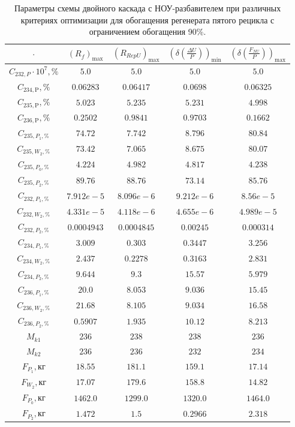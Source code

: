 \begin{table}
    \begin{tabular}{ccccc}
    $\cdot$ & $(R_f)_\text{max}$ & $(R_{RepU})_\text{max}$ & $(\delta(\frac{\Delta U}{P}))_\text{min}$ & $(\delta(\frac{F_{NU}}{P}))_\text{max}$\\ \hline
    $C_{232,P}\cdot10^{7}, \%$ & $5.0$ & $5.0$ & $5.0$ & $5.0$\\ \hline
    $C_{234,\text{P}}, \%$ & $0.06283$ & $0.06417$ & $0.0698$ & $0.06325$\\ \hline
    $C_{235,\text{P}}, \%$ & $5.023$ & $5.235$ & $5.231$ & $4.998$\\ \hline
    $C_{236,\text{P}}, \%$ & $0.2502$ & $0.9841$ & $0.9703$ & $0.1662$\\ \hline
    $C_{235,P_1, \%}$      & $74.72$ & $7.742$ & $8.796$ & $80.84$\\ \hline
    $C_{235,W_2, \%}$      & $73.42$ & $7.065$ & $8.675$ & $80.07$\\ \hline
    $C_{235,P_0, \%}$      & $4.224$ & $4.982$ & $4.817$ & $4.238$\\ \hline
    $C_{235,P_2, \%}$      & $89.76$ & $88.76$ & $73.14$ & $85.76$\\ \hline
    $C_{232,P_1, \%}$      & $7.912e-5$ & $8.096e-6$ & $9.212e-6$ & $8.56e-5$\\ \hline
    $C_{232,W_2, \%}$      & $4.331e-5$ & $4.118e-6$ & $4.655e-6$ & $4.989e-5$\\ \hline
    $C_{232,P_2, \%}$      & $0.0004943$ & $0.0004845$ & $0.00245$ & $0.000314$\\ \hline
    $C_{234,P_1, \%}$      & $3.009$ & $0.303$ & $0.3447$ & $3.256$\\ \hline
    $C_{234,W_2, \%}$      & $2.437$ & $0.2278$ & $0.3163$ & $2.831$\\ \hline
    $C_{234,P_2, \%}$      & $9.644$ & $9.3$ & $15.57$ & $5.979$\\ \hline
    $C_{236,P_1, \%}$      & $20.0$ & $8.053$ & $9.036$ & $15.45$\\ \hline
    $C_{236,W_2, \%}$      & $21.68$ & $8.105$ & $9.034$ & $16.58$\\ \hline
    $C_{236,P_2, \%}$      & $0.5907$ & $1.935$ & $10.12$ & $8.213$\\ \hline
    $M_{k1}$               & $236$ & $238$ & $238$ & $236$\\ \hline
    $M_{k2}$               & $236$ & $236$ & $232$ & $234$\\ \hline
    $F_{P_1}, \text{кг}$   & $18.55$ & $181.1$ & $159.1$ & $17.14$\\ \hline
    $F_{W_2}, \text{кг}$   & $17.07$ & $179.6$ & $158.8$ & $14.82$\\ \hline
    $F_{P_0}, \text{кг}$   & $1462.0$ & $1299.0$ & $1320.0$ & $1464.0$\\ \hline
    $F_{P_2}, \text{кг}$   & $1.472$ & $1.5$ & $0.2966$ & $2.318$
    \end{tabular}
\caption{Параметры схемы двойного каскада с НОУ-разбавителем при различных критериях оптимизации для обогащения регенерата пятого рецикла с ограничением обогащения 90\%.{\label{2opt5_90}}}
\end{table}


